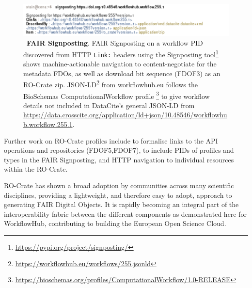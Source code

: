 \begin{figure}
  \centering
      \includegraphics[width=\textwidth]{figures/ch04/signposting.pdf}
      \caption[FAIR Signposting]{~\textbf{FAIR Signposting}.
  FAIR Signposting on a workflow PID \cite{Bayarri 2022} 
  discovered from HTTP \texttt{Link:} headers using the
  Signposting tool\protect\footnote{\url{https://pypi.org/project/signposting/}} shows
  machine-actionable navigation to content-negotiate for the metadata
  FDOs, as well as download bit sequence (FDOF3) as an RO-Crate zip.
  JSON-LD\protect\footnote{\url{https://workflowhub.eu/workflows/255.jsonld}} from
  workflowhub.eu follows the BioSchemas
  ComputationalWorkflow
  profile \protect\footnote{\url{https://bioschemas.org/profiles/ComputationalWorkflow/1.0-RELEASE}} 
  to give workflow details not included in DataCite's general 
  JSON-LD from \url{https://data.crosscite.org/application/ld+json/10.48546/workflowhub.workflow.255.1}.
}
\label{fig:signposting}
\end{figure} 

Further work on RO-Crate profiles include to formalise links to the API
operations and repositories (FDOF5,FDOF7), to include PIDs of
profiles and types in the FAIR Signposting, and HTTP navigation to
individual resources within the RO-Crate.

RO-Crate has shown a broad adoption by communities across many
scientific disciplines, providing a lightweight, and therefore easy to
adopt, approach to generating FAIR Digital Objects. It is rapidly
becoming an integral part of the interoperability fabric between the
different components as demonstrated here for WorkflowHub, contributing
to building the European Open Science Cloud.
